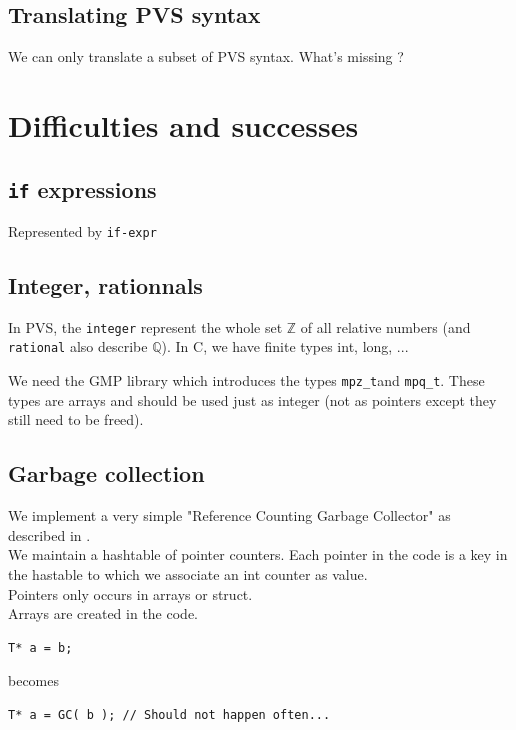 \documentclass[12pt,a4paper,titlepage]{article}
\newcommand{\Z}{\mathbb{Z}}
\newcommand{\Q}{\mathbb{Q}}
\newcommand{\mpzt}{\texttt{mpz\_t}}
\newcommand{\mpqt}{\texttt{mpq\_t}}
\begin{document}
\subsection{Translating PVS syntax}


We can only translate a subset of PVS syntax.
What's missing ?



\section{Difficulties and successes}


\subsection{\texttt{if} expressions}
Represented by \texttt{if-expr}

\subsection{Integer, rationnals}
In PVS, the \texttt{integer} represent the whole set $\Z$ of all relative numbers (and \texttt{rational} also describe $\Q$).
In C, we have finite types
int, long, ...

We need the GMP library which introduces the types \mpzt and \mpqt.
These types are arrays and should be used just as integer (not as pointers except they still need to be freed).


\subsection{ Garbage collection }

We implement a very simple "Reference Counting Garbage Collector" as described in \cite{jonesgarbage}.\\

We maintain a hashtable of pointer counters.
Each pointer in the code is a key in the hastable to which we associate an int counter as value.\\

Pointers only occurs in arrays or struct.\\

Arrays are created in the code.\\


\begin{lstlisting}
T* a = b;
\end{lstlisting}
becomes
\begin{lstlisting}
T* a = GC( b ); // Should not happen often...
\end{lstlisting}
\end{document}
